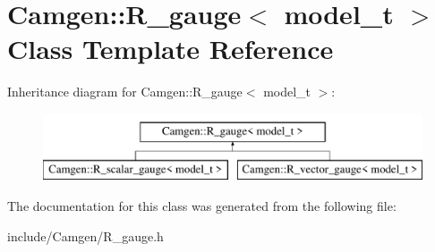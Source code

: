 \hypertarget{a00453}{\section{Camgen\-:\-:R\-\_\-gauge$<$ model\-\_\-t $>$ Class Template Reference}
\label{a00453}
}
Inheritance diagram for Camgen\-:\-:R\-\_\-gauge$<$ model\-\_\-t $>$\-:\begin{figure}[H]
\begin{center}
\leavevmode
\includegraphics[height=2.000000cm]{a00453}
\end{center}
\end{figure}


The documentation for this class was generated from the following file\-:\begin{DoxyCompactItemize}
\item 
include/\-Camgen/R\-\_\-gauge.\-h\end{DoxyCompactItemize}
